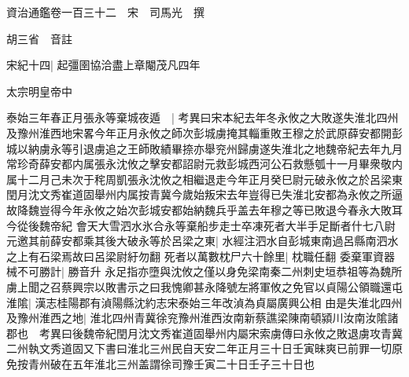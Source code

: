 






























































資治通鑑卷一百三十二　宋　司馬光　撰

胡三省　音註

宋紀十四|{
	起彊圉協洽盡上章閹茂凡四年}


太宗明皇帝中

泰始三年春正月張永等棄城夜遁　|{
	考異曰宋本紀去年冬永攸之大敗遂失淮北四州及豫州淮西地宋畧今年正月永攸之師次彭城虜掩其輜重敗王穆之於武原薛安都開彭城以納虜永等引退虜追之王師敗績畢捺亦舉兖州歸虜遂失淮北之地魏帝紀去年九月常珍奇薛安都内属張永沈攸之擊安都詔尉元救彭城西河公石救懸瓠十一月畢衆敬内属十二月己未次于秺周凱張永沈攸之相繼退走今年正月癸巳尉元破永攸之於呂梁東閏月沈文秀崔道固舉州内属按青冀今歲始叛宋去年豈得已失淮北安都為永攸之所逼故降魏豈得今年永攸之始次彭城安都始納魏兵乎盖去年穆之等已敗退今春永大敗耳今從後魏帝紀}
會天大雪泗水氷合永等棄船步走士卒凍死者大半手足斷者什七八尉元邀其前薛安都乘其後大破永等於呂梁之東|{
	水經注泗水自彭城東南過呂縣南泗水之上有石梁焉故曰呂梁尉紆勿翻}
死者以萬數枕尸六十餘里|{
	枕職任翻}
委棄軍資器械不可勝計|{
	勝音升}
永足指亦墮與沈攸之僅以身免梁南秦二州刺史垣恭祖等為魏所虜上聞之召蔡興宗以敗書示之曰我愧卿甚永降號左將軍攸之免官以貞陽公領職還屯淮隂|{
	漢志桂陽郡有湞陽縣沈約志宋泰始三年改湞為貞屬廣興公相}
由是失淮北四州及豫州淮西之地|{
	淮北四州青冀徐兖豫州淮西汝南新蔡譙梁陳南頓潁川汝南汝隂諸郡也　考異曰後魏帝紀閏月沈文秀崔道固舉州内屬宋索虜傳曰永攸之敗退虜攻青冀二州執文秀道固又下書曰淮北三州民自天安二年正月三十日壬寅昧爽已前罪一切原免按青州破在五年淮北三州盖謂徐司豫壬寅二十日壬子三十日也}


